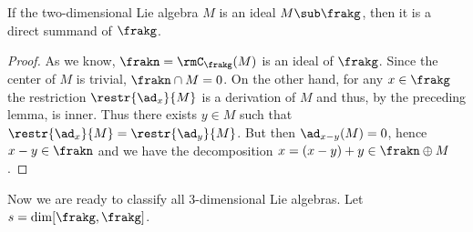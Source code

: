 \begin{lem}\label{lem 2}
    If the two-dimensional Lie algebra $M$ is an ideal $M\sub \frakg$, then it is a direct summand of $\frakg$.
\end{lem}
\begin{proof}
    As we know, $\frakn=\rmC_\frakg(M)$ is an ideal of $\frakg$. Since the center of $M$ is trivial, $\frakn\cap M=0$. On the other hand, for any $x\in\frakg$ the restriction $\restr{\ad_x}{M}$ is a derivation of $M$ and thus, by the preceding lemma, is inner. Thus there exists $y\in M$ such that $\restr{\ad_x}{M}=\restr{\ad_y}{M}$. But then $\ad_{x-y}(M)=0$, hence $x-y\in \frakn$ and we have the decomposition $x=(x-y)+y\in \frakn\oplus M$.
\end{proof}


Now we are ready to classify all 3-dimensional Lie algebras. Let $s=\dim[\frakg,\frakg]$.
